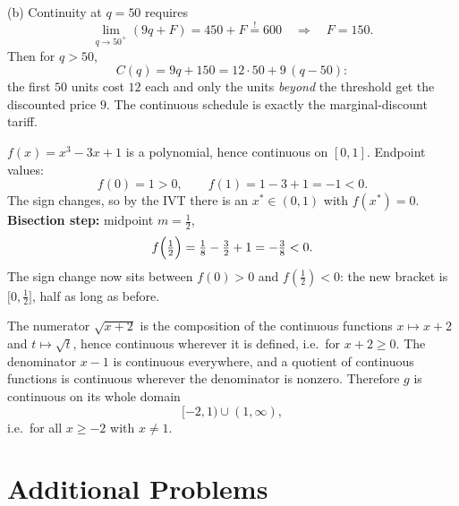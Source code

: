 \begin{solutions}
        (b) Continuity at $q=50$ requires
        \[
          \lim_{q\to 50^{+}}(9q+F)=450+F\overset{!}{=}600
          \quad\Longrightarrow\quad
          F=150 .
        \]
        Then for $q>50$,
        \[
          C(q)=9q+150=12\cdot 50+9\,(q-50):
        \]
        the first $50$ units cost $12$ each and only the units
        \emph{beyond} the threshold get the discounted price $9$. The
        continuous schedule is exactly the marginal-discount tariff.

  \item $f(x)=x^{3}-3x+1$ is a polynomial, hence continuous on $[0,1]$.
        Endpoint values:
        \[
          f(0)=1>0,
          \qquad
          f(1)=1-3+1=-1<0 .
        \]
        The sign changes, so by the IVT there is an $x^{*}\in(0,1)$ with
        $f(x^{*})=0$. \textbf{Bisection step:} midpoint $m=\tfrac12$,
        \[
          f\Bigl(\tfrac12\Bigr)
          =\tfrac18-\tfrac32+1=-\tfrac38<0 .
        \]
        The sign change now sits between $f(0)>0$ and
        $f(\tfrac12)<0$: the new bracket is $\bigl[0,\tfrac12\bigr]$,
        half as long as before.

  \item The numerator $\sqrt{x+2}$ is the composition of the continuous
        functions $x\mapsto x+2$ and $t\mapsto\sqrt{t}$, hence
        continuous wherever it is defined, i.e.\ for $x+2\ge 0$. The
        denominator $x-1$ is continuous everywhere, and a quotient of
        continuous functions is continuous wherever the denominator is
        nonzero. Therefore $g$ is continuous on its whole domain
        \[
          [-2,1)\cup(1,\infty),
        \]
        i.e.\ for all $x\ge -2$ with $x\neq 1$.
\end{solutions}

\section{Additional Problems}

